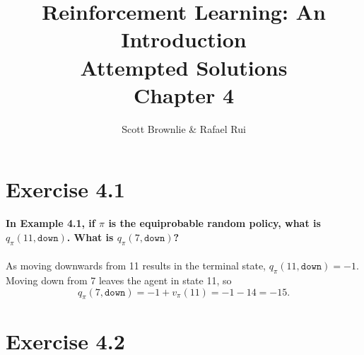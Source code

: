 \documentclass[a4paper,11pt]{article}
\title{Reinforcement Learning: An Introduction \\ Attempted Solutions \\ Chapter 4}
\author{Scott Brownlie \& Rafael Rui}
\date{}
\numberwithin{equation}{section}
\theoremstyle{remark}
\begin{document}
\maketitle

\section{Exercise 4.1}

\textbf{In Example 4.1, if $\pi$ is the equiprobable random policy, what is $q_\pi(11, \texttt{down})$. What is $q_\pi(7, \texttt{down})$?}
\\ \\
As moving downwards from 11 results in the terminal state, $q_\pi(11, \texttt{down}) = -1$. Moving down from 7 leaves the agent in state 11, so 
\[
	q_\pi(7, \texttt{down}) = -1 + v_\pi(11) = -1 - 14 = -15.
\]

\section{Exercise 4.2}
\end{document}
